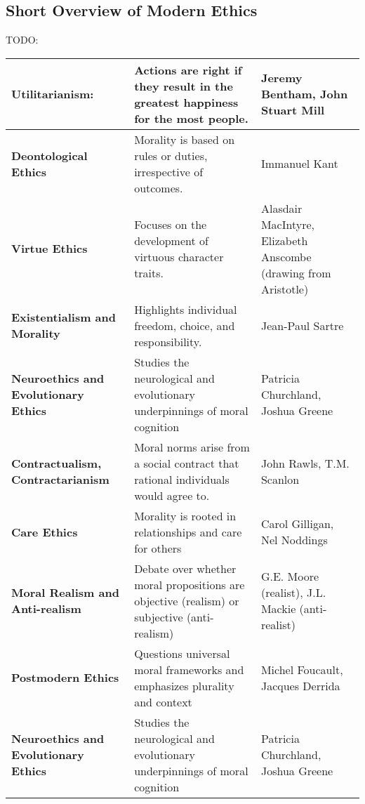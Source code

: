 \documentclass[11pt,a4]{article}
\begin{document}
\subsection{Short Overview of Modern Ethics}
    TODO:
\begin{table}[h!]
    \centering
    \begin{tabular}{p{3cm} p{5cm} p{4cm} }
    \hline

    \textbf{Utilitarianism:}
        & Actions are right if they result in the greatest happiness for the most people.
        & Jeremy Bentham, John Stuart Mill \\ \hline

    \textbf{Deontological Ethics}
        & Morality is based on rules or duties, irrespective of outcomes.
        & Immanuel Kant \\ \hline

    \textbf{Virtue Ethics}
        & Focuses on the development of virtuous character traits.
        & Alasdair MacIntyre, Elizabeth Anscombe (drawing from Aristotle)\\ \hline

    \textbf{Existentialism and Morality}
        & Highlights individual freedom, choice, and responsibility.
        & Jean-Paul Sartre\\ \hline

    \textbf{Neuroethics and Evolutionary Ethics}
        & Studies the neurological and evolutionary underpinnings of moral cognition
        & Patricia Churchland, Joshua Greene\\ \hline

    \textbf{Contractualism, Contractarianism}
        & Moral norms arise from a social contract that rational individuals
          would agree to.
        & John Rawls, T.M. Scanlon \\ \hline

    \textbf{Care Ethics}
        & Morality is rooted in relationships and care for others
        & Carol Gilligan, Nel Noddings \\ \hline

    \textbf{Moral Realism and Anti-realism }
        & Debate over whether moral propositions are objective (realism)
        or subjective (anti-realism)
        & G.E. Moore (realist), J.L. Mackie (anti-realist) \\  \hline

    \textbf{Postmodern Ethics}
        & Questions universal moral frameworks and emphasizes plurality and context
        & Michel Foucault, Jacques Derrida \\ \hline

    \textbf{Neuroethics and Evolutionary Ethics}
        & Studies the neurological and evolutionary underpinnings of moral cognition
        & Patricia Churchland, Joshua Greene \\
    \hline

    \end{tabular}
\end{table}
\end{document}
